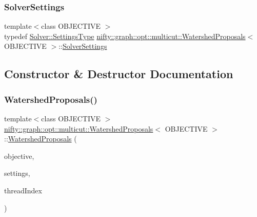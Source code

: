 \subsubsection{\texorpdfstring{Solver\+Settings}{SolverSettings}}
{\footnotesize\ttfamily template$<$class O\+B\+J\+E\+C\+T\+I\+VE $>$ \\
typedef \hyperlink{classnifty_1_1graph_1_1opt_1_1multicut_1_1MulticutGreedyAdditive_a074ee39f5884cff7359f5c0997929e2f}{Solver\+::\+Settings\+Type} \hyperlink{classnifty_1_1graph_1_1opt_1_1multicut_1_1WatershedProposals}{nifty\+::graph\+::opt\+::multicut\+::\+Watershed\+Proposals}$<$ O\+B\+J\+E\+C\+T\+I\+VE $>$\+::\hyperlink{classnifty_1_1graph_1_1opt_1_1multicut_1_1WatershedProposals_ae59892ab06d67fc3099a0e352e4e51b9}{Solver\+Settings}}



\subsection{Constructor \& Destructor Documentation}
\mbox{\label{classnifty_1_1graph_1_1opt_1_1multicut_1_1WatershedProposals_a9d2d0702cfa98b669ebbb5ea2d4a1f07}} 
\subsubsection{\texorpdfstring{Watershed\+Proposals()}{WatershedProposals()}}
{\footnotesize\ttfamily template$<$class O\+B\+J\+E\+C\+T\+I\+VE $>$ \\
\hyperlink{classnifty_1_1graph_1_1opt_1_1multicut_1_1WatershedProposals}{nifty\+::graph\+::opt\+::multicut\+::\+Watershed\+Proposals}$<$ O\+B\+J\+E\+C\+T\+I\+VE $>$\+::\hyperlink{classnifty_1_1graph_1_1opt_1_1multicut_1_1WatershedProposals}{Watershed\+Proposals} (\begin{DoxyParamCaption}\item[{const \hyperlink{classnifty_1_1graph_1_1opt_1_1multicut_1_1WatershedProposals_a2ea604fcb16dc28bf52164ec5b3f232a}{Objective\+Type} \&}]{objective,  }\item[{const \hyperlink{structnifty_1_1graph_1_1opt_1_1multicut_1_1WatershedProposals_1_1SettingsType}{Settings\+Type} \&}]{settings,  }\item[{const size\+\_\+t}]{thread\+Index }\end{DoxyParamCaption})\hspace{0.3cm}{\ttfamily [inline]}}

